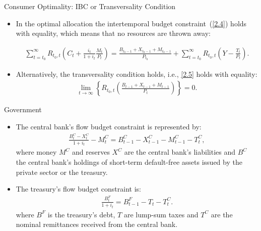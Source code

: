 \documentclass[11pt,aspectratio=169]{beamer}
\begin{document}
\begin{frame}{Consumer Optimality: IBC or Transversality Condition}

\begin{itemize}
\item In the optimal allocation the intertemporal budget constraint~(\ref{2.4}) holds with equality, which means that no resources are thrown away: 

\begin{align}
\sum_{t=t_0}^\infty R_{t_0,t}\left(C_t + \frac{i_t}{1+i_t}\frac{M_t}{P_t}\right)
= \frac{B_{t_0-1}+X_{t_0-1}+M_{t_0-1}}{P_{t_0}} + \sum_{t=t_0}^\infty R_{t_0,t}\left(Y-\frac{T_t}{P_t}\right). \label{2.9}
\end{align}

\item Alternatively, the transversality condition holds, i.e., \eqref{2.5} holds with equality: 
\begin{align}
\lim_{t \to \infty} \left\{ 
R_{t_0,t} \left( \frac{B_{t-1} + X_{t-1} + M_{t-1}}{P_t}\right) \right\} = 0. \label{2.10}
\end{align}
\end{itemize}

\end{frame}

\begin{frame}{Government}
\begin{itemize}

\item The central bank's flow budget constraint is represented by:
\begin{align}
    \frac{B_t^C - X_t^C}{1 + i_t} - M_t^C = B_{t-1}^C - X_{t-1}^C - M_{t-1}^C - T_{t}^C, \label{2.11}
\end{align}
where money $M^C$ and reserves $X^C$ are the central bank's liabilities and $B^C$ the central bank's holdings of short-term default-free assets issued by the private sector or the treasury. 
\item The treasury's flow budget constraint is: 
\begin{align}
    \frac{B_t^F}{1+i_t} = B_{t-1}^F - T_t - T_t^C. \label{2.12}
\end{align}
where $B^F$ is the treasury's debt, $T$ are lump-sum taxes and $T^C$ are the nominal remittances received from the central bank. 
\end{itemize}

\end{frame}
\end{document}
